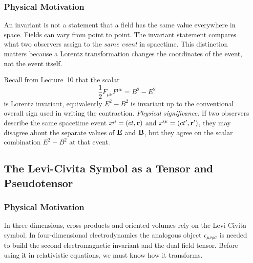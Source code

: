 \subsubsection*{Physical Motivation}
An invariant is not a statement that a field has the same value everywhere in space.
Fields can vary from point to point.  The invariant statement compares what two observers
assign to the \emph{same event} in spacetime.  This distinction matters because a Lorentz
transformation changes the coordinates of the event, not the event itself.

Recall from Lecture~10 that the scalar
\begin{equation}\label{eq:lec11:E2minusB2}
  \boxed{
  \frac{1}{2}F_{\mu\nu}F^{\mu\nu}=B^2-E^2
  }
\end{equation}
is Lorentz invariant, equivalently $E^2-B^2$ is invariant up to the conventional
overall sign used in writing the contraction.
\textit{Physical significance:} If two observers describe the same spacetime event
$x^\mu=(ct,\mathbf{r})$ and $x'^\mu=(ct',\mathbf{r}')$, they may disagree about the separate
values of $\mathbf{E}$ and $\mathbf{B}$, but they agree on the scalar combination $E^2-B^2$ at
that event.

\begin{center}
\end{center}

\subsection{The Levi-Civita Symbol as a Tensor and Pseudotensor}\label{subsec:lec11-epsilon}

\subsubsection*{Physical Motivation}
In three dimensions, cross products and oriented volumes rely on the Levi-Civita symbol.
In four-dimensional electrodynamics the analogous object $\epsilon_{\mu\nu\rho\sigma}$
is needed to build the second electromagnetic invariant and the dual field tensor.
Before using it in relativistic equations, we must know how it transforms.

